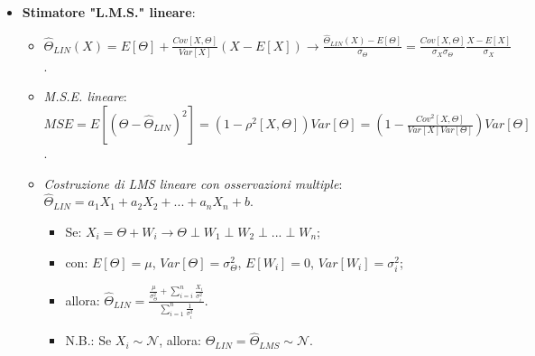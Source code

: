 \documentclass[8pt]{extarticle}
\begin{document}
\begin{multicols*}{3}
\begin{itemize}
\begin{itemize}
\begin{itemize}
                        \end{itemize}
              \end{itemize}
        \item \textbf{Stimatore "L.M.S." lineare}:
              \begin{itemize}
                  \item $\hat{\Theta}_{LIN}(X)=E[\Theta]+\frac{Cov[X, \Theta]}{Var[X]}(X-E[X])\rightarrow\frac{\hat{\Theta}_{LIN}(X)-E[\Theta]}{\sigma_{\Theta}}=\frac{Cov[X,\Theta]}{\sigma_{X}\sigma_{\Theta}}\frac{X-E[X]}{\sigma_{X}}$.
                  \item \textit{M.S.E. lineare}: $MSE=E[(\Theta-\hat{\Theta}_{LIN})^2]=(1-\rho^{2}[X,\Theta])Var[\Theta]=(1-\frac{Cov^{2}[X,\Theta]}{Var[X]Var[\Theta]})Var[\Theta]$.
                  \item \textit{Costruzione di LMS lineare con osservazioni multiple}: $\hat{\Theta}_{LIN}=a_{1}X_{1}+a_{2}X_{2}+...+a_{n}X_{n}+b$.
                        \begin{itemize}
                            \item Se: $X_{i}=\Theta + W_{i}\rightarrow \Theta\perp W_{1}\perp W_{2}\perp ...\perp W_{n}$;
                            \item con: $E[\Theta]=\mu$, $Var[\Theta]=\sigma^{2}_{\Theta}$, $E[W_{i}]=0$, $Var[W_{i}]=\sigma^{2}_{i}$;
                            \item allora: $\hat{\Theta}_{LIN}=\frac{\frac{\mu}{\sigma^{2}_{\Theta}}+\sum_{i=i}^{n}\frac{X_{i}}{\sigma^{2}_{i}}}{\sum_{i=1}^{n}\frac{1}{\sigma^{2}_{i}}}$.
                            \item N.B.: Se $X_{i}\sim\mathcal{N}$, allora: $\hat{\Theta}_{LIN}=\hat{\Theta}_{LMS}\sim\mathcal{N}$.
                        \end{itemize}
              \end{itemize}
    \end{itemize}

\end{multicols*}
\end{document}
